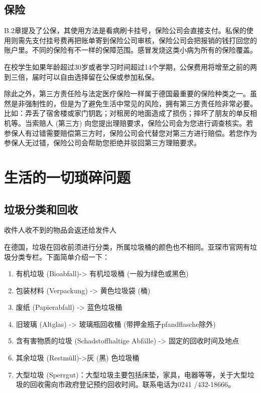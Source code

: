   \subsection{保险}

    B.2章提及了公保，其使用方法是看病刷卡挂号，保险公司会直接支付。私保的使用则需先支付挂号费再把账单寄到保险公司审核，保险公司会把报销的钱打回您的账户里。不同的保险有不一样的保障范围。感冒发烧这类小病为所有的保险覆盖。

    在校学生如果年龄超过30岁或者学习时间超过14个学期，公保费用将增至之前的两到三倍，届时可以自由选择留在公保或参加私保。

    除此之外，第三方责任险与法定医疗保险一样属于德国最重要的保险种类之一。虽然是非强制性的，但是为了避免生活中常见的风险，拥有第三方责任险非常必要。比如：弄丢了宿舍楼或家门钥匙；对租房的地面造成了损伤；摔坏了朋友的单反相机等。当索赔人 (第三方) 向您提出理赔要求，保险公司会为您进行调查核实。若参保人有过错需要赔偿第三方时，保险公司会代替您对第三方进行赔偿。若您作为参保人无过错，保险公司会帮助您拒绝并驳回第三方理赔要求。

\section{生活的一切琐碎问题}

  \subsection{垃圾分类和回收}

    收件人收不到的物品会返还给发件人

    在德国，垃圾在回收前须进行分类，所属垃圾桶的颜色也不相同。亚琛市官网有垃圾分类专栏。下面简单介绍一下：

    \begin{enumerate}
      \item 有机垃圾 (Bioabfall)-> 有机垃圾桶 (一般为绿色或黑色)
      \item 包装材料 (Verpackung) -> 黄色垃圾袋 (桶)
      \item 废纸 (Papierabfall) -> 蓝色垃圾桶
      \item 旧玻璃 (Altglas) -> 玻璃瓶回收桶 (带押金瓶子pfandflasche除外)
      \item 含有害物质的垃圾 (Schadstoffhaltige Abfälle) -> 固定的回收时间及地点
      \item 其余垃圾 (Restmüll)->灰 (黑) 色垃圾桶
      \item 大型垃圾 (Sperrgut)：大型垃圾主要包括床垫，家具，电器等等，关于大型垃圾的回收需向市政府登记预约回收时间。联系电话为0241 /432-18666。
    \end{enumerate}

